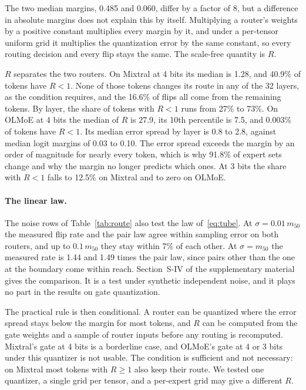\documentclass[journal]{IEEEtran}
\begin{document}
The two median margins, 0.485 and 0.060, differ by a factor of 8, but a difference in
absolute margins does not explain this by itself. Multiplying a router's weights by a positive constant multiplies every margin by it, and
under a per-tensor uniform grid it multiplies the quantization error by the same constant, so
every routing decision and every flip stays the same. The scale-free quantity is $R$.

$R$ separates the two routers. On Mixtral at 4 bits its median is 1.28, and 40.9\% of tokens have
$R < 1$. None of those tokens changes its route in any of the 32 layers, as the condition
requires, and the 16.6\% of flips all come from the remaining tokens. By layer, the share of
tokens with $R < 1$ runs from 27\% to 73\%. On OLMoE at 4 bits the median of $R$ is 27.9, its
10th percentile is 7.5, and 0.003\% of tokens have $R < 1$. Its median error spread by layer is
0.8 to 2.8, against median logit margins of 0.03 to 0.10. The error spread exceeds the margin
by an order of magnitude for nearly every token, which is why 91.8\% of expert sets change and
why the margin no longer predicts which ones. At 3 bits the share with $R < 1$ falls to 12.5\% on
Mixtral and to zero on OLMoE.

\paragraph{The linear law.} The noise rows of Table~\ref{tab:route} also test the law
of~\eqref{eq:tube}. At $\sigma = 0.01\,m_{50}$ the measured flip rate and the pair law agree
within sampling error on both routers, and up to $0.1\,m_{50}$ they stay within 7\% of each
other. At $\sigma = m_{50}$ the measured rate is 1.44 and 1.49 times the pair law, since pairs
other than the one at the boundary come within reach. Section~S-IV of the supplementary material gives the
comparison. It is a test under synthetic independent noise, and it plays no part in the results
on gate quantization.

The practical rule is then conditional. A router can be quantized where the error spread stays
below the margin for most tokens, and $R$ can be computed from the gate weights and a sample of
router inputs before any routing is recomputed. Mixtral's gate at 4 bits is a borderline case, and
OLMoE's gate at 4 or 3 bits under this quantizer is not usable. The condition is sufficient and
not necessary: on Mixtral most tokens with $R \geq 1$ also keep their route. We tested one
quantizer, a single grid per tensor, and a per-expert grid may give a different $R$.
\end{document}
